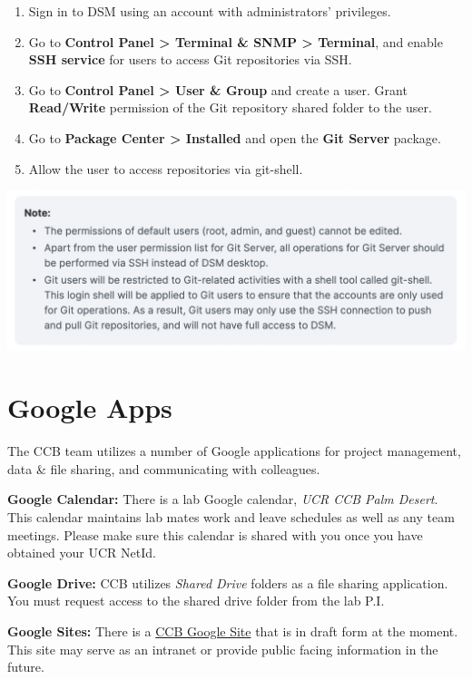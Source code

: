 \documentclass[
]{book}
\providecommand{\tightlist}{%
  \setlength{\itemsep}{0pt}\setlength{\parskip}{0pt}}
\begin{document}
\begin{enumerate}
\def\labelenumi{\arabic{enumi}.}
\tightlist
\item
  Sign in to DSM using an account with administrators' privileges.
\item
  Go to \textbf{Control Panel \textgreater{} Terminal \& SNMP \textgreater{} Terminal}, and enable \textbf{SSH service} for users to access Git repositories via SSH.
\item
  Go to \textbf{Control Panel \textgreater{} User \& Group} and create a user. Grant \textbf{Read/Write} permission of the Git repository shared folder to the user.
\item
  Go to \textbf{Package Center \textgreater{} Installed} and open the \textbf{Git Server} package.
\item
  Allow the user to access repositories via git-shell.
\end{enumerate}

\begin{flushleft}\includegraphics[width=0.85\linewidth]{images/git_usernote} \end{flushleft}

\hypertarget{google-apps}{%
\section{Google Apps}\label{google-apps}}

The CCB team utilizes a number of Google applications for project management, data \& file sharing, and communicating with colleagues.

\textbf{Google Calendar:} There is a lab Google calendar, \emph{UCR CCB Palm Desert}. This calendar maintains lab mates work and leave schedules as well as any team meetings. Please make sure this calendar is shared with you once you have obtained your UCR NetId.

\textbf{Google Drive:} CCB utilizes \emph{Shared Drive} folders as a file sharing application. You must request access to the shared drive folder from the lab P.I.

\textbf{Google Sites:} There is a \href{https://sites.google.com/ucr.edu/ccbucr/home}{CCB Google Site} that is in draft form at the moment. This site may serve as an intranet or provide public facing information in the future.
\end{document}
